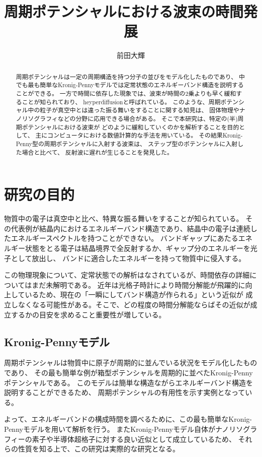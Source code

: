 \documentclass[autodetect-engine,dvipdfmx-if-dvi,ja=standard,a4j,layout=v2,10pt]{bxjsreport}
\author{前田大輝}
\title{周期ポテンシャルにおける波束の時間発展}
\begin{document}
    \maketitle
    \begin{abstract}
      \par
      周期ポテンシャルは一定の周期構造を持つ分子の並びをモデル化したものであり、
      中でも最も簡単なKronig-Pennyモデルでは定常状態のエネルギーバンド構造を説明することができる。
      一方で時間に依存した現象では、波束が時間の2乗よりも早く緩和することが知られており、
      heyperdiffusionと呼ばれている。
      このような、周期ポテンシャル中の粒子が真空中とは違った振る舞いをすることに関する知見は、
      固体物理やナノリソグラフィなどの分野に応用できる場合がある。
      そこで本研究は、特定の(半)周期ポテンシャルにおける波束が
      どのように緩和していくのかを解析することを目的として、
      主にコンピュータにおける数値計算的な手法を用いている。
      その結果Kronig-Penny型の周期ポテンシャルに入射する波束は、
      ステップ型のポテンシャルに入射した場合と比べて、
      反射波に遅れが生じることを発見した。
    \end{abstract}
    \tableofcontents
    \chapter{研究の目的}
    \begin{chapterabstract}
      物質中の電子は真空中と比べ、特異な振る舞いをすることが知られている。
      その代表例が結晶内におけるエネルギーバンド構造であり、結晶中の電子は連続したエネルギースペクトルを持つことができない。
      バンドギャップにあたるエネルギー状態をとる電子は結晶境界で全反射するか、ギャップ分のエネルギーを光子として放出し、
      バンドに適合したエネルギーを持って物質中に侵入する。\par
      この物理現象について、定常状態での解析はなされているが、時間依存の詳細についてはまだ未解明である。
      近年は光格子時計により時間分解能が飛躍的に向上しているため、現在の「一瞬にしてバンド構造が作られる」という近似が
      成立しなくなる可能性がある。そこで、どの程度の時間分解能ならばその近似が成立するかの目安を求めること重要性が増している。\par
    \end{chapterabstract}
    \section{Kronig-Pennyモデル}
    周期ポテンシャルは物質中に原子が周期的に並んでいる状況をモデル化したものであり、
    その最も簡単な例が箱型ポテンシャルを周期的に並べたKronig-Pennyポテンシャルである。
    このモデルは簡単な構造ながらエネルギーバンド構造を説明することができるため、
    周期ポテンシャルの有用性を示す実例となっている。\par
    よって、エネルギーバンドの構成時間を調べるために、この最も簡単なKronig-Pennyモデルを用いて解析を行う。
    またKronig-Pennyモデル自体がナノリソグラフィーの素子や半導体超格子に対する良い近似として成立しているため、
    それらの性質を知る上で、この研究は実際的な研究となる。
\end{document}

